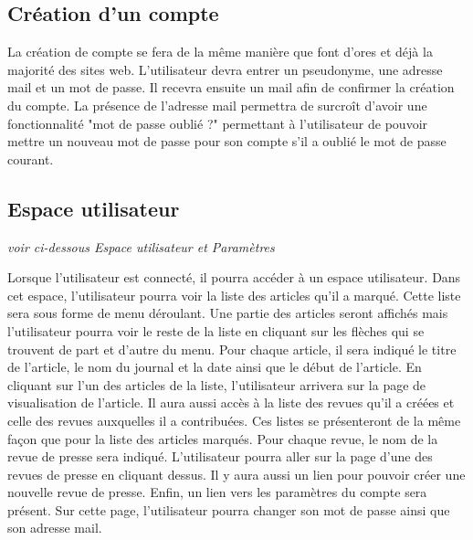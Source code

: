 \subsection{Création d'un compte}
\label{creation_compte}


La création de compte se fera de la même manière que font d'ores et déjà la majorité des sites web. L'utilisateur devra entrer un pseudonyme, une adresse mail et un mot de passe. Il recevra ensuite un mail afin de confirmer la création du compte. La présence de l'adresse mail permettra de surcroît d'avoir une fonctionnalité "mot de passe oublié ?" permettant à l'utilisateur de pouvoir mettre un nouveau mot de passe pour son compte s'il a oublié le mot de passe courant.


\subsection{Espace utilisateur}
\label{espace_util}

\textit{voir ci-dessous Espace utilisateur et Paramètres}


Lorsque l'utilisateur est connecté, il pourra accéder à un espace utilisateur. Dans cet espace, l'utilisateur pourra voir la liste des articles qu'il a marqué. Cette liste sera sous forme de menu déroulant. Une partie des articles seront affichés mais l'utilisateur pourra voir le reste de la liste en cliquant sur les flèches qui se trouvent de part et d'autre du menu. Pour chaque article, il sera indiqué le titre de l'article, le nom du journal et la date ainsi que le début de l'article. En cliquant sur l'un des articles de la liste, l'utilisateur arrivera sur la page de visualisation de l'article.
Il aura aussi accès à la liste des revues qu'il a créées et celle des revues auxquelles il a contribuées. Ces listes se présenteront de la même façon que pour la liste des articles marqués. Pour chaque revue, le nom de la revue de presse sera indiqué. L'utilisateur pourra aller sur la page d'une des revues de presse en cliquant dessus.
Il y aura aussi un lien pour pouvoir créer une nouvelle revue de presse. 
Enfin, un lien vers les paramètres du compte sera présent.  Sur cette page, l'utilisateur pourra changer son mot de passe ainsi que son adresse mail.

